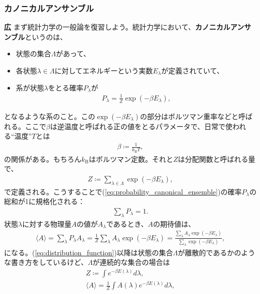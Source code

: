 \documentclass[paper=b5j,fontsize=12Q,jafontsize=12Q,baselineskip=21Q]{jlreq}
\DeclareRobustCommand{\hiron}{\textbf{広 }}
\begin{document}
\begin{refsection}
\subsubsection{カノニカルアンサンブル}
\hiron まず統計力学の一般論を復習しよう。統計力学において、\textbf{カノニカルアンサンブル}というのは、
\begin{itemize}
  \item 状態の集合$\Lambda$があって、
  \item 各状態$\lambda\in\Lambda$に対してエネルギーという実数$E_\lambda$が定義されていて、
  \item 系が状態$\lambda$をとる確率$P_\lambda$が
  \begin{align}
    P_\lambda=\frac1Z\exp\left(-\beta E_\lambda\right),\label{eq:probability_canonical_ensemble}
  \end{align}
\end{itemize}
となるような系のこと。この$\exp\left(-\beta E_\lambda\right)$の部分はボルツマン重率などと呼ばれる。ここで$\beta$は逆温度と呼ばれる正の値をとるパラメータで、日常で使われる``温度''$T$とは
\begin{align}
  \beta\coloneqq\frac1{k_{\mathrm B}T},
\end{align}
の関係がある。もちろん$k_{\mathrm B}$はボルツマン定数。それと$Z$は分配関数と呼ばれる量で、
\begin{align}
  Z\coloneqq\sum_{\lambda\in\Lambda}\exp\left(-\beta E_\lambda\right),\label{eq:distribution_function}
\end{align}
で定義される。こうすることで(\ref{eq:probability_canonical_ensemble})の確率$P_\lambda$の総和が1に規格化される：
\begin{align}
  \sum_\lambda P_\lambda=1.
\end{align}
状態$\lambda$に対する物理量$A$の値が$A_\lambda$であるとき、$A$の期待値は、
\begin{align}
  \langle A\rangle=\sum_\lambda P_\lambda A_\lambda=\frac1Z\sum_\lambda A_\lambda\exp\left(-\beta E_\lambda\right)=\frac{\sum_\lambda A_\lambda\exp\left(-\beta E_\lambda\right)}{\sum_\lambda\exp\left(-\beta E_\lambda\right)},
\end{align}
になる。(\ref{eq:distribution_function})以降は状態の集合$\Lambda$が離散的であるかのような書き方をしているけど、$\Lambda$が連続的な集合の場合は
\begin{gather}
  Z\coloneqq\int e^{-\beta E(\lambda)}d\lambda,\\
  \langle A\rangle=\frac1Z\int A(\lambda)e^{-\beta E(\lambda)}d\lambda,
\end{gather}

\end{refsection}
\end{document}
